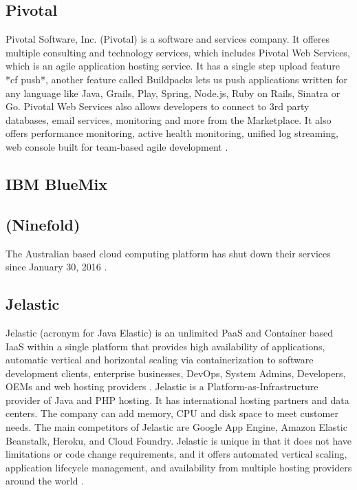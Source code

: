 \pv

\subsection{Pivotal}

    Pivotal Software, Inc. (Pivotal) is a software and services
    company. It offeres multiple consulting and technology services,
    which includes Pivotal Web Services, which is an agile application
    hosting service. It has a single step upload feature *cf push*,
    another feature called Buildpacks lets us push applications
    written for any language like Java, Grails, Play, Spring, Node.js,
    Ruby on Rails, Sinatra or Go. Pivotal Web Services also allows
    developers to connect to 3rd party databases, email services,
    monitoring and more from the Marketplace. It also offers
    performance monitoring, active health monitoring, unified log
    streaming, web console built for team-based agile development
    \cite{pivotal-www}.

\subsection{IBM BlueMix}

\pv

\subsection{(Ninefold)}

    The Australian based cloud computing platform has shut down their
    services since January 30, 2016 \cite{www-ninefoldSite}.

    \pv

\subsection{Jelastic}

    Jelastic (acronym for Java Elastic) is an unlimited PaaS and
    Container based IaaS within a single platform that provides high
    availability of applications, automatic vertical and horizontal
    scaling via containerization to software development clients,
    enterprise businesses, DevOps, System Admins, Developers, OEMs and
    web hosting providers \cite{www-jelastic-2}. Jelastic is a
    Platform-as-Infrastructure provider of Java and PHP hosting.  It
    has international hosting partners and data centers. The company
    can add memory, CPU and disk space to meet customer needs. The
    main competitors of Jelastic are Google App Engine, Amazon Elastic
    Beanstalk, Heroku, and Cloud Foundry. Jelastic is unique in that it
    does not have limitations or code change requirements, and it
    offers automated vertical scaling, application lifecycle
    management, and availability from multiple hosting providers
    around the world \cite{www-jelastic-1}.


